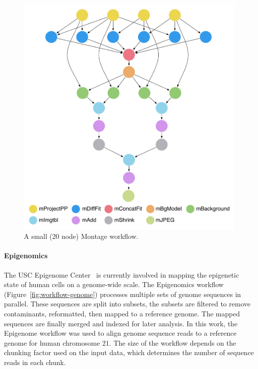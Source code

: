 \begin{figure}[!htt]
	\centering
	\includegraphics[width=0.9\linewidth]{figures/workflow-montage}
	\caption{A small (20 node) Montage workflow.}
	\label{fig:workflow-montage}
\end{figure}


\paragraph{\textbf{Epigenomics}}
The USC Epigenome Center~\cite{genome} is currently involved in mapping the epigenetic 
state of human cells on a genome-wide scale. The Epigenomics workflow 
(Figure~\ref{fig:workflow-genome}) processes multiple sets of genome sequences in
parallel. These sequences are split into subsets, the subsets are filtered to remove
contaminants, reformatted, then mapped to a reference genome. The mapped sequences are
finally merged and indexed for later analysis. In this work, the Epigenome workflow was 
used to align genome sequence reads to a reference genome for human chromosome 
21. The size of the workflow depends on the chunking factor used on the input data, 
which determines the number of sequence reads in each chunk.

